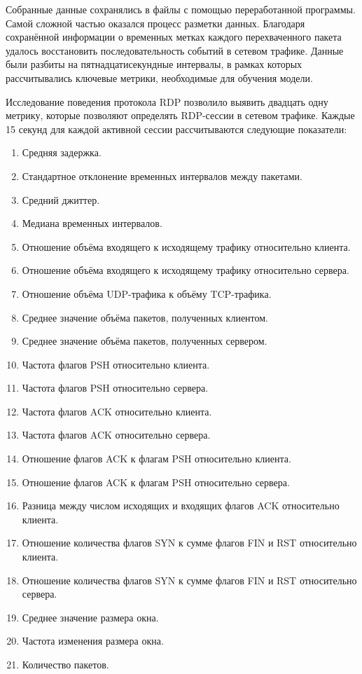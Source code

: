 \documentclass[bachelor, och, coursework]{SCWorks}
\begin{document}
Собранные данные сохранялись в файлы с помощью переработанной программы. Самой сложной частью оказался процесс разметки данных. Благодаря сохранённой 
информации о временных метках каждого перехваченного пакета удалось восстановить последовательность событий в сетевом трафике. Данные были разбиты на 
пятнадцатисекундные интервалы, в рамках которых рассчитывались ключевые метрики, необходимые для обучения модели.  

Исследование поведения протокола RDP позволило выявить двадцать одну метрику, которые позволяют определять RDP-сессии в сетевом трафике.
Каждые 15 секунд для каждой активной сессии рассчитываются следующие показатели:

\begin{enumerate}
  \item Средняя задержка.
  \item Стандартное отклонение временных интервалов между пакетами.
  \item Средний джиттер.
  \item Медиана временных интервалов.
  \item Отношение объёма входящего к исходящему трафику относительно клиента.
  \item Отношение объёма входящего к исходящему трафику относительно сервера.
  \item Отношение объёма UDP-трафика к объёму TCP-трафика.
  \item Среднее значение объёма пакетов, полученных клиентом.
  \item Среднее значение объёма пакетов, полученных сервером.
  \item Частота флагов PSH относительно клиента.
  \item Частота флагов PSH относительно сервера.
  \item Частота флагов ACK относительно клиента.
  \item Частота флагов ACK относительно сервера.
  \item Отношение флагов ACK к флагам PSH относительно клиента.
  \item Отношение флагов ACK к флагам PSH относительно сервера.
  \item Разница между числом исходящих и входящих флагов ACK относительно клиента.
  \item Отношение количества флагов SYN к сумме флагов FIN и RST относительно клиента.
  \item Отношение количества флагов SYN к сумме флагов FIN и RST относительно сервера.
  \item Среднее значение размера окна.
  \item Частота изменения размера окна.
  \item Количество пакетов.
\end{enumerate}
\end{document}
